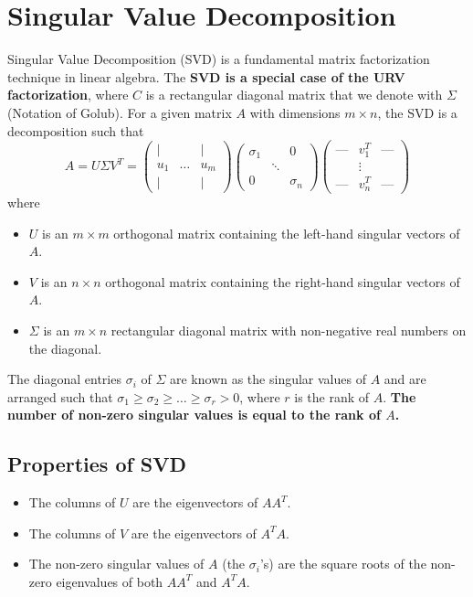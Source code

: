 \chapter{Singular Value Decomposition}
Singular Value Decomposition (SVD) is a fundamental matrix factorization technique in linear algebra.
The \textbf{SVD is a special case of the URV factorization}, where $C$ is a rectangular diagonal matrix that we denote with $\Sigma$ (Notation of Golub).
For a given matrix $A$ with dimensions $m \times n$, the SVD is a decomposition such that
\[
A = U \Sigma V^T = 
\begin{pmatrix}
\vert & & \vert \\
u_1 & \dots & u_m \\
\vert & & \vert
\end{pmatrix}
\begin{pmatrix}
\sigma_1 & & 0 \\
& \ddots & \\
0 & & \sigma_n
\end{pmatrix}
\begin{pmatrix}
\text{---} & v_1^T & \text{---} \\
& \vdots & \\
\text{---} & v_n^T & \text{---}
\end{pmatrix}
\]
where
\begin{itemize}
    \item $U$ is an $m \times m$ orthogonal matrix containing the left-hand singular vectors of $A$.
    \item $V$ is an $n \times n$ orthogonal matrix containing the right-hand singular vectors of $A$.
    \item $\Sigma$ is an $m \times n$ rectangular diagonal matrix with non-negative real numbers on the diagonal.
\end{itemize}

The diagonal entries $\sigma_i$ of $\Sigma$ are known as the singular values of $A$
and are arranged such that $\sigma_1 \geq \sigma_2 \geq \dots \geq \sigma_r > 0$,
where $r$ is the rank of $A$. \newline
\textbf{The number of non-zero singular values is equal to the rank of $A$.}

\section{Properties of SVD}
\begin{itemize}
    \item The columns of $U$ are the eigenvectors of $AA^T$.
    \item The columns of $V$ are the eigenvectors of $A^TA$.
    \item The non-zero singular values of $A$ (the $\sigma_i$'s) are the square roots of the non-zero eigenvalues of both $AA^T$ and $A^TA$.
\end{itemize}

